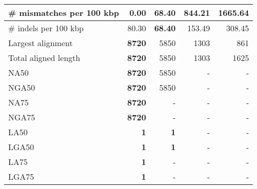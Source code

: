 \documentclass[12pt,a4paper]{article}
\begin{document}
\begin{table}[ht]
\begin{center}
\begin{tabular}{|l*{4}{|r}|}
\# mismatches per 100 kbp & {\bf 0.00} & 68.40 & 844.21 & 1665.64 \\ \hline
\# indels per 100 kbp & 80.30 & {\bf 68.40} & 153.49 & 308.45 \\ \hline
Largest alignment & {\bf 8720} & 5850 & 1303 & 861 \\ \hline
Total aligned length & {\bf 8720} & 5850 & 1303 & 1625 \\ \hline
NA50 & {\bf 8720} & 5850 & - & - \\ \hline
NGA50 & {\bf 8720} & 5850 & - & - \\ \hline
NA75 & {\bf 8720} & - & - & - \\ \hline
NGA75 & {\bf 8720} & - & - & - \\ \hline
LA50 & {\bf 1} & {\bf 1} & - & - \\ \hline
LGA50 & {\bf 1} & {\bf 1} & - & - \\ \hline
LA75 & {\bf 1} & - & - & - \\ \hline
LGA75 & {\bf 1} & - & - & - \\ \hline
\end{tabular}
\end{center}
\end{table}
\end{document}
